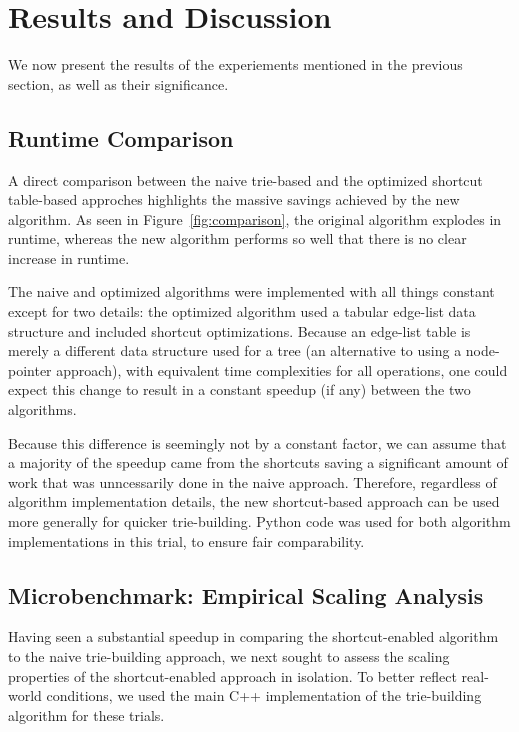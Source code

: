 \section{Results and Discussion} \label{sec:results}

We now present the results of the experiements mentioned in the previous section, as well as their significance.

\subsection{Runtime Comparison}

A direct comparison between the naive trie-based and the optimized shortcut table-based approches highlights the massive savings achieved by the new algorithm.
As seen in Figure~\ref{fig:comparison}, the original algorithm explodes in runtime, whereas the new algorithm performs so well that there is no clear increase in runtime.



The naive and optimized algorithms were implemented with all things constant except for two details: the optimized algorithm used a tabular edge-list data structure and included shortcut optimizations.
Because an edge-list table is merely a different data structure used for a tree (an alternative to using a node-pointer approach), with equivalent time complexities for all operations, one could expect this change to result in a constant speedup (if any) between the two algorithms.

Because this difference is seemingly not by a constant factor, we can assume that a majority of the speedup came from the shortcuts saving a significant amount of work that was unncessarily done in the naive approach. 
Therefore, regardless of algorithm implementation details, the new shortcut-based approach can be used more generally for quicker trie-building.
Python code was used for both algorithm implementations in this trial, to ensure fair comparability.

\subsection{Microbenchmark: Empirical Scaling Analysis}



Having seen a substantial speedup in comparing the shortcut-enabled algorithm to the naive trie-building approach, we next sought to assess the scaling properties of the shortcut-enabled approach in isolation.
To better reflect real-world conditions, we used the main C++ implementation of the trie-building algorithm for these trials.

